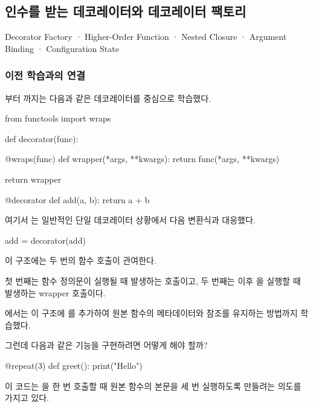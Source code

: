 

\subsection{인수를 받는 데코레이터와 데코레이터 팩토리}

Decorator Factory · Higher-Order Function · Nested Closure · Argument Binding · Configuration State

\subsubsection{이전 학습과의 연결}

부터 까지는 다음과 같은 데코레이터를 중심으로 학습했다.

\begin{dhkcode}
from functools import wraps

def decorator(func):

    @wraps(func)
    def wrapper(*args, **kwargs):
        return func(*args, **kwargs)

    return wrapper


@decorator
def add(a, b):
    return a + b
\end{dhkcode}

여기서 는 일반적인 단일 데코레이터 상황에서 다음 변환식과 대응했다.

\begin{dhkcode}
add = decorator(add)
\end{dhkcode}

이 구조에는 두 번의 함수 호출이 관여한다.

첫 번째는 함수 정의문이 실행될 때 발생하는  호출이고, 두 번째는 이후 을 실행할 때 발생하는 wrapper 호출이다.

에서는 이 구조에 를 추가하여 원본 함수의 메타데이터와  참조를 유지하는 방법까지 학습했다.

그런데 다음과 같은 기능을 구현하려면 어떻게 해야 할까?

\begin{dhkcode}
@repeat(3)
def greet():
    print("Hello")
\end{dhkcode}

이 코드는 을 한 번 호출할 때 원본 함수의 본문을 세 번 실행하도록 만들려는 의도를 가지고 있다.

